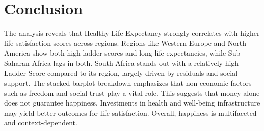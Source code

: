 \documentclass[11pt,preprint]{elsarticle}
\numberwithin{equation}{section}
\numberwithin{figure}{section}
\numberwithin{table}{section}
\begin{document}
\section{Conclusion}\label{conclusion}

The analysis reveals that Healthy Life Expectancy strongly correlates
with higher life satisfaction scores across regions. Regions like
Western Europe and North America show both high ladder scores and long
life expectancies, while Sub-Saharan Africa lags in both. South Africa
stands out with a relatively high Ladder Score compared to its region,
largely driven by residuals and social support. The stacked barplot
breakdown emphasizes that non-economic factors such as freedom and
social trust play a vital role. This suggests that money alone does not
guarantee happiness. Investments in health and well-being infrastructure
may yield better outcomes for life satisfaction. Overall, happiness is
multifaceted and context-dependent.


\end{document}
